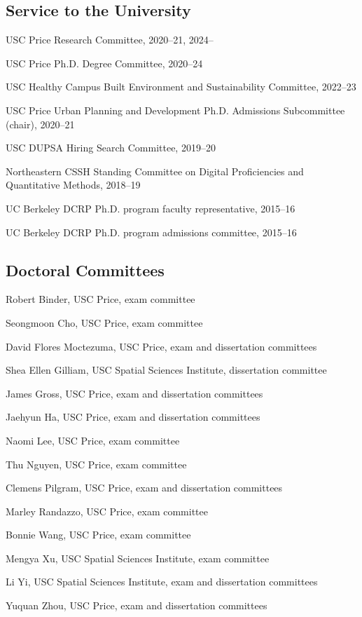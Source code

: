 \documentclass[11pt,letterpaper]{report}
\newcommand{\listitemspace}{0.25em}
\renewenvironment{itemize}
{\begin{list}{}{\setlength{\leftmargin}{0em}
                \setlength{\parskip}{0em}
                \setlength{\itemsep}{\listitemspace}
                \setlength{\parsep}{\listitemspace}}}
{\end{list}}
\begin{document}
    \subsection*{Service to the University}

    \begin{itemize}
        \item USC Price Research Committee, 2020--21, 2024--
        \item USC Price Ph.D. Degree Committee, 2020--24
        \item USC Healthy Campus Built Environment and Sustainability Committee, 2022--23
        \item USC Price Urban Planning and Development Ph.D. Admissions Subcommittee (chair), 2020--21
        \item USC DUPSA Hiring Search Committee, 2019--20
        \item Northeastern CSSH Standing Committee on Digital Proficiencies and Quantitative Methods, 2018--19
        \item UC Berkeley DCRP Ph.D. program faculty representative, 2015--16
        \item UC Berkeley DCRP Ph.D. program admissions committee, 2015--16

    \end{itemize}

    \subsection*{Doctoral Committees}

    \begin{itemize}

        \item Robert Binder, USC Price, exam committee
        \item Seongmoon Cho, USC Price, exam committee
        \item David Flores Moctezuma, USC Price, exam and dissertation committees
        \item Shea Ellen Gilliam, USC Spatial Sciences Institute, dissertation committee
        \item James Gross, USC Price, exam and dissertation committees
        \item Jaehyun Ha, USC Price, exam and dissertation committees
        \item Naomi Lee, USC Price, exam committee
        \item Thu Nguyen, USC Price, exam committee
        \item Clemens Pilgram, USC Price, exam and dissertation committees
        \item Marley Randazzo, USC Price, exam committee
        \item Bonnie Wang, USC Price, exam committee
        \item Mengya Xu, USC Spatial Sciences Institute, exam committee
        \item Li Yi, USC Spatial Sciences Institute, exam and dissertation committees
        \item Yuquan Zhou, USC Price, exam and dissertation committees

    \end{itemize}
\end{document}
